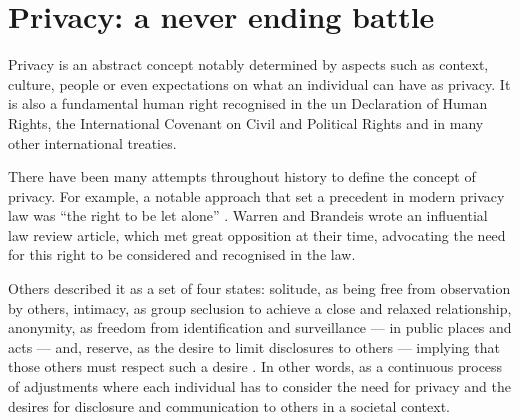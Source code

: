 


\section{Privacy: a never ending battle}
    \label{section:thesis:privacy-a-never-ending-battle}

Privacy is an abstract concept notably determined by aspects such as context, culture, 
people or even expectations on what an individual can have as privacy. It is also 
a fundamental human right recognised in the \ac{un} Declaration of Human Rights, 
the International Covenant on Civil and Political Rights and in many other international 
treaties.

There have been many attempts throughout history to define the concept of privacy. 
For example, a notable approach that set a precedent in modern privacy law was ``the 
right to be let alone'' \cite{WarrenB90}. Warren and Brandeis wrote an influential 
law review article, which met great opposition at their time, advocating the need 
for this right to be considered and recognised in the  law. 

Others described it as a set of four states: solitude, as being free from observation 
by others, intimacy, as group seclusion to achieve a close and relaxed relationship, 
anonymity, as freedom from identification and surveillance --- in public places 
and acts --- and, reserve, as the desire to limit disclosures to others --- implying 
that those others must respect such a desire \cite{Westin70}. In other words, as a 
continuous process of adjustments where each individual has to consider the need 
for privacy and the desires for disclosure and communication to others in a societal 
context.

